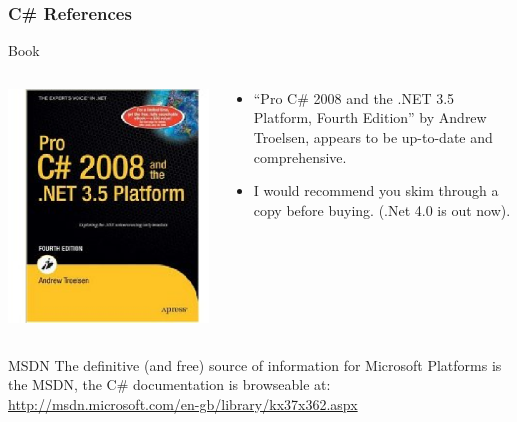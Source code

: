 \documentclass[table]{beamer}
\let\oldurl=\url
\renewcommand{\url}[1]{\textcolor{blue}{\oldurl{#1}}}
\begin{document}
\begin{frame}
\frametitle{C\# References}
\begin{block}{Book}
\begin{columns}
\begin{column}{1cm}
\includegraphics[width=2.0\textwidth]{csharp.eps}
\end{column}
\begin{column}{0.8\textwidth}
\begin{itemize}
\item ``Pro C\# 2008 and the .NET 3.5 Platform, Fourth Edition'' by Andrew Troelsen,
appears to be up-to-date and comprehensive.
\item I would recommend you skim through a copy before buying. (.Net 4.0 is out now).
\end{itemize}
\end{column}
\end{columns}
\end{block}
\begin{exampleblock}{MSDN}
The definitive (and free) source of information for Microsoft Platforms is the MSDN, the C\# documentation is browseable at:\\
{\footnotesize \url{http://msdn.microsoft.com/en-gb/library/kx37x362.aspx}}
\end{exampleblock}

\end{frame}
\end{document}

